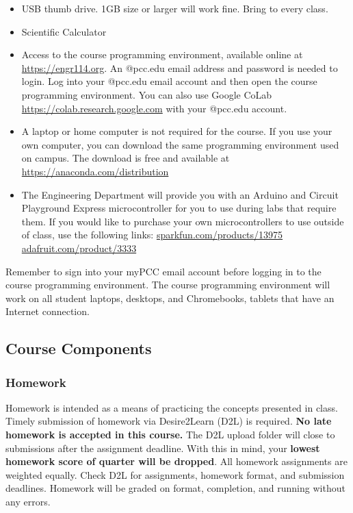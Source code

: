 \documentclass[11pt]{article}
\providecommand{\tightlist}{%
      \setlength{\itemsep}{0pt}\setlength{\parskip}{0pt}}
\begin{document}
\begin{itemize}
\tightlist
\item
  USB thumb drive. 1GB size or larger will work fine. Bring to every
  class.
\item
  Scientific Calculator
\item
  Access to the course programming environment, available online at
  \url{https://engr114.org}. An @pcc.edu email address and password is
  needed to login. Log into your @pcc.edu email account and then open
  the course programming environment. You can also use Google CoLab
  \url{https://colab.research.google.com} with your @pcc.edu account.
\item
  A laptop or home computer is not required for the course. If you use
  your own computer, you can download the same programming environment
  used on campus. The download is free and available at
  \href{https://www.anaconda.com/distribution/}{https://anaconda.com/distribution}
\item
  The Engineering Department will provide you with an Arduino and
  Circuit Playground Express microcontroller for you to use during labs
  that require them. If you would like to purchase your own
  microcontrollers to use outside of class, use the following links:
  \href{https://www.sparkfun.com/products/13975}{sparkfun.com/products/13975}
  \href{https://www.adafruit.com/product/3333}{adafruit.com/product/3333}
\end{itemize}

Remember to sign into your
myPCC email account before logging in to the course programming
environment. The course programming environment will work on all student
laptops, desktops, and Chromebooks, tablets that have an Internet
connection.

    \hypertarget{course-components}{%
\subsection{Course Components}\label{course-components}}

    \hypertarget{homework}{%
\subsubsection{Homework}\label{homework}}

Homework is intended as a means of practicing the concepts presented in
class. Timely submission of homework via Desire2Learn (D2L) is required.
\textbf{No late homework is accepted in this course.} The D2L upload
folder will close to submissions after the assignment deadline. With
this in mind, your \textbf{lowest homework score of quarter will be
dropped}. All homework assignments are weighted equally. Check D2L for
assignments, homework format, and submission deadlines. Homework will be
graded on format, completion, and running without any errors.
\end{document}
